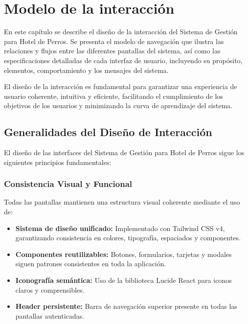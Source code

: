 \chapter{Modelo de la interacción}	
\label{cap:modInteraccion}

En este capítulo se describe el diseño de la interacción del Sistema de Gestión para Hotel de Perros. Se presenta el modelo de navegación que ilustra las relaciones y flujos entre las diferentes pantallas del sistema, así como las especificaciones detalladas de cada interfaz de usuario, incluyendo su propósito, elementos, comportamiento y los mensajes del sistema.

El diseño de la interacción es fundamental para garantizar una experiencia de usuario coherente, intuitiva y eficiente, facilitando el cumplimiento de los objetivos de los usuarios y minimizando la curva de aprendizaje del sistema.

\section{Generalidades del Diseño de Interacción}

El diseño de las interfaces del Sistema de Gestión para Hotel de Perros sigue los siguientes principios fundamentales:

\subsection{Consistencia Visual y Funcional}
Todas las pantallas mantienen una estructura visual coherente mediante el uso de:
\begin{itemize}
    \item \textbf{Sistema de diseño unificado:} Implementado con Tailwind CSS v4, garantizando consistencia en colores, tipografía, espaciados y componentes.
    \item \textbf{Componentes reutilizables:} Botones, formularios, tarjetas y modales siguen patrones consistentes en toda la aplicación.
    \item \textbf{Iconografía semántica:} Uso de la biblioteca Lucide React para iconos claros y comprensibles.
    \item \textbf{Header persistente:} Barra de navegación superior presente en todas las pantallas autenticadas.
\end{itemize}

